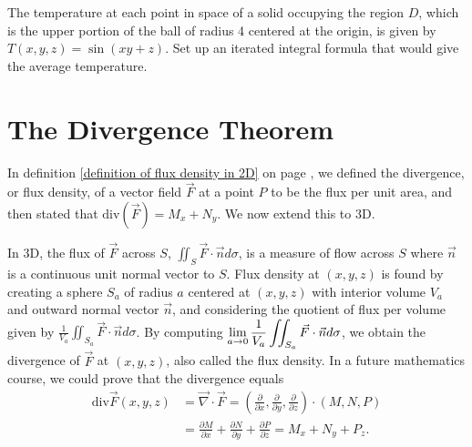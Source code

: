 \begin{problem}
The temperature at each point in space of a solid occupying the region {$D$}, which is the upper portion of the ball of radius 4 centered at the origin, is given by $T(x,y,z) = \sin(xy+z)$.  Set up an iterated integral formula that would give the average temperature.   
\end{problem}













\section{The Divergence Theorem}


In definition \ref{definition of flux density in 2D} on page \pageref{definition of flux density in 2D}, we defined the divergence, or flux density, of a vector field $\vec F$ at a point $P$ to be the flux per unit area, and then stated that $\text{div}(\vec F)=M_x+N_y$. We now extend this to 3D.

In 3D, the flux of $\vec F$ across $S$, $\iint_S\vec F\cdot \vec n d\sigma$, is a measure of flow across $S$ where $\vec n$ is a continuous unit normal vector to $S$.  Flux density at $(x,y,z)$ is found by creating a sphere $S_a$ of radius $a$ centered at $(x,y,z)$ with interior volume $V_a$ and outward normal vector $\vec n$, and considering the quotient of flux per volume given by $\frac{1}{V_a}\iint_{S_a} \vec F \cdot \vec n d\sigma$. By computing $\displaystyle \lim_{a\to 0}\frac{1}{V_a}\iint_{S_a} \vec F \cdot \vec n d\sigma$, we obtain the divergence of $\vec F$ at $(x,y,z)$, also called the flux density. In a future mathematics course, we could prove that the divergence equals
\begin{align*}
\text{div}\vec F(x,y,z) 
&= \vec \nabla\cdot \vec F 
= \left(\frac{\partial }{\partial x},\frac{\partial }{\partial y},\frac{\partial }{\partial z} \right)\cdot (M,N,P) \\
&= \frac{\partial M}{\partial x}+\frac{\partial N}{\partial y}+\frac{\partial P}{\partial z} 
= M_x+N_y+P_z 
.
\end{align*}


